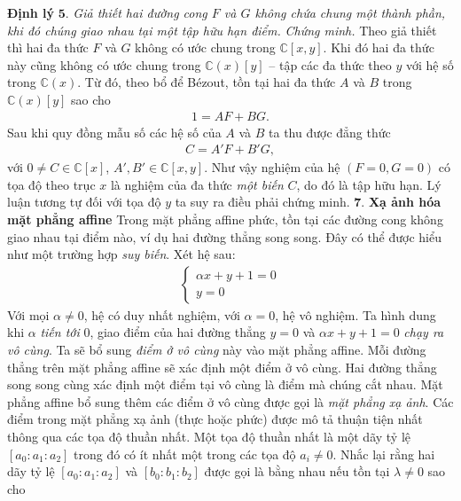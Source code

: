 \begin{multicols}{2}
	\vskip 0.1cm
	\textbf{\color{duongvaotoanhoc}Định lý} $\pmb{5.}$ \textit{Giả thiết hai đường cong $F$  và $G$  không chứa chung một thành phần, khi đó chúng giao nhau tại một tập hữu hạn điểm.}
	\vskip 0.1cm
	\textit{Chứng minh.}
	Theo giả thiết thì hai đa thức $F$ và $G$ không có ước chung trong $\mathbb C[x,y]$. Khi đó hai đa thức này cũng không có ước chung trong $\mathbb C(x)[y]$ -- tập các đa thức theo $y$ với hệ số trong $\mathbb C(x)$. Từ đó, theo bổ để B\'ezout, tồn tại hai đa thức $A$ và $B$ trong  $\mathbb C(x)[y]$ sao cho
	\begin{align*}
		1=AF+BG.
	\end{align*}
	Sau khi quy đồng mẫu số các hệ số của $A$ và $B$ ta thu được đẳng thức
	\begin{align*}
		C= A'F+ B'G,
	\end{align*}
	với $0\neq C\in\mathbb C[x]$, $ A', B'\in \mathbb C[x,y]$. 
	Như vậy nghiệm của hệ $(F=0, G=0)$ có tọa độ theo trục $x$ là nghiệm của đa thức {\em một biến} $C$, do đó là tập hữu hạn. Lý luận tương tự đối với tọa độ $y$ ta suy ra điều phải chứng minh. 
	\vskip 0.1cm
	$\pmb{7.}$ \textbf{\color{duongvaotoanhoc}Xạ ảnh hóa mặt phẳng affine} 
	\vskip 0.1cm
	Trong mặt phẳng affine phức, tồn tại các đường cong không giao nhau tại điểm nào, ví dụ hai đường thẳng song song. 
	Đây có thể được hiểu như một trường hợp {\em suy biến}. Xét hệ sau:
	\begin{align*}
		\begin{cases}
			\alpha x+y+1 =0\\
			y=0
		\end{cases}
	\end{align*}
	Với mọi $\alpha\neq 0$, hệ có duy nhất nghiệm, với $\alpha=0$, hệ vô nghiệm. 
	\vskip 0.1cm
	Ta hình dung khi $\alpha$ {\em tiến tới} $0$, giao điểm của hai đường thẳng $y=0$ và $\alpha x+y+1=0$ {\em chạy ra vô cùng}. Ta sẽ bổ sung {\em điểm ở vô cùng} này vào mặt phẳng affine. Mỗi đường thẳng trên mặt phẳng affine sẽ xác định một điểm ở vô cùng. Hai đường thẳng song song cùng xác định một điểm tại vô cùng là điểm mà chúng cắt nhau. 
	\vskip 0.1cm
	Mặt phẳng affine bổ sung thêm các điểm ở vô cùng được gọi là {\em mặt phẳng xạ ảnh}. Các điểm trong mặt phẳng xạ ảnh (thực hoặc phức) được mô tả thuận tiện nhất thông qua các tọa độ thuần nhất. Một tọa độ thuần nhất là một dãy tỷ lệ $[a_0:a_1:a_2]$ trong đó có ít nhất một trong các tọa độ $a_i\neq 0$. Nhắc lại rằng hai dãy tỷ lệ $[a_0:a_1:a_2]$ và $[b_0:b_1:b_2]$ được gọi là bằng nhau nếu tồn tại $\lambda\neq 0$ sao cho
	\begin{align*}

\end{align*}
\end{multicols}
